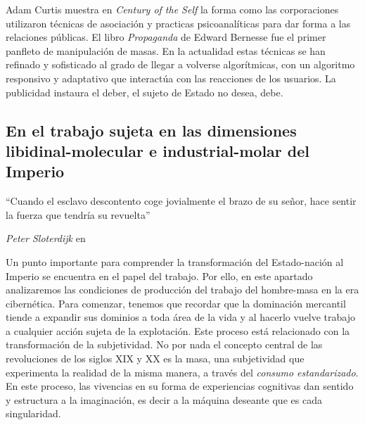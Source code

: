 Adam Curtis muestra en \emph{Century of the Self} la forma como las corporaciones utilizaron técnicas de asociación y practicas psicoanalíticas para dar forma a las relaciones públicas. El libro \emph{Propaganda} de Edward Bernesse fue el primer panfleto de manipulación de masas. En la actualidad estas técnicas se han refinado y sofisticado al grado de llegar a volverse algorítmicas, con un algoritmo responsivo y adaptativo que interactúa con las reacciones de los usuarios. La publicidad instaura el deber, el sujeto de Estado no desea, debe.

\subsection[En el trabajo \emph{sujeta} en las dimensiones\ldots{}]%
{En el trabajo sujeta en las dimensiones libidinal-molecular e industrial-molar del Imperio}
\label{sub:en-el-trabajo-sujeta-en}

\epigraph{\enquote{Cuando el esclavo descontento coge jovialmente el brazo de su
señor, hace sentir la fuerza que tendría su revuelta}}{\emph{Peter Sloterdijk} en~\autocite{sloterdijkCriticaRazonCinica2014}}

Un punto importante para comprender la transformación del Estado-nación al Imperio se encuentra en el papel del trabajo. Por ello, en este apartado analizaremos las condiciones de producción del trabajo del hombre-masa en la era cibernética. Para comenzar, tenemos que recordar que la dominación mercantil tiende a expandir sus dominios a toda área de la vida y al hacerlo vuelve trabajo a cualquier acción sujeta de la explotación. Este proceso está relacionado con la transformación de la subjetividad. No por nada el concepto central de las revoluciones de los siglos XIX y XX es la masa, una subjetividad que experimenta la realidad de la misma manera, a través del \emph{consumo estandarizado}. En este proceso, las vivencias en su forma de experiencias cognitivas dan sentido y estructura a la imaginación, es decir a la máquina deseante que es cada singularidad.

